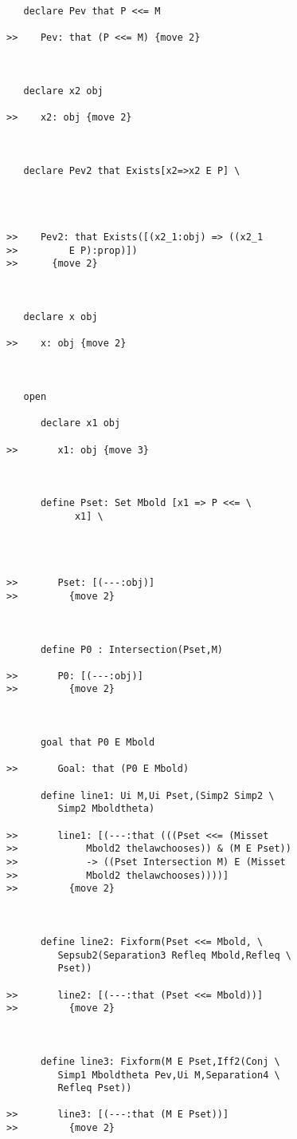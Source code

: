 \documentclass[12pt]{article}
\begin{document}
\begin{verbatim}
   declare Pev that P <<= M

>>    Pev: that (P <<= M) {move 2}



   declare x2 obj

>>    x2: obj {move 2}



   declare Pev2 that Exists[x2=>x2 E P] \
      



>>    Pev2: that Exists([(x2_1:obj) => ((x2_1
>>         E P):prop)])
>>      {move 2}



   declare x obj

>>    x: obj {move 2}



   open

      declare x1 obj

>>       x1: obj {move 3}



      define Pset: Set Mbold [x1 => P <<= \
            x1] \
         



>>       Pset: [(---:obj)]
>>         {move 2}



      define P0 : Intersection(Pset,M)

>>       P0: [(---:obj)]
>>         {move 2}



      goal that P0 E Mbold

>>       Goal: that (P0 E Mbold)

      define line1: Ui M,Ui Pset,(Simp2 Simp2 \
         Simp2 Mboldtheta)

>>       line1: [(---:that (((Pset <<= (Misset
>>            Mbold2 thelawchooses)) & (M E Pset))
>>            -> ((Pset Intersection M) E (Misset
>>            Mbold2 thelawchooses))))]
>>         {move 2}



      define line2: Fixform(Pset <<= Mbold, \
         Sepsub2(Separation3 Refleq Mbold,Refleq \
         Pset))

>>       line2: [(---:that (Pset <<= Mbold))]
>>         {move 2}



      define line3: Fixform(M E Pset,Iff2(Conj \
         Simp1 Mboldtheta Pev,Ui M,Separation4 \
         Refleq Pset))

>>       line3: [(---:that (M E Pset))]
>>         {move 2}




\end{verbatim}
\end{document}
